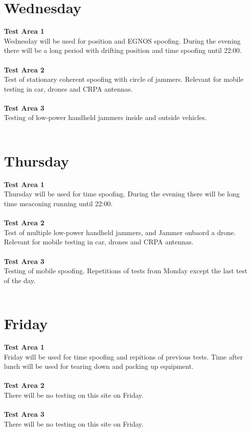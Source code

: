 \documentclass[a4paper]{book}
\begin{document}
\begin{landscape}
\chapter{Wednesday}
\Large \textbf{Test Area 1} \\
Wednesday will be used for position and EGNOS spoofing. During the evening there will be a long period with drifting position and time spoofing until 22:00. \\ \\
\Large \textbf{Test Area 2} \\
Test of stationary coherent spoofing with circle of jammers. Relevant for mobile testing in car, drones and CRPA antennas.\\ \\
\Large \textbf{Test Area 3} \\
Testing of low-power handheld jammers inside and outside vehicles.\\ \\

%

\chapter{Thursday}
\Large \textbf{Test Area 1} \\
Thursday will be used for time spoofing. During the evening there will be long time meaconing running until 22:00.\\ \\
\Large \textbf{Test Area 2} \\
Test of multiple low-power handheld jammers, and Jammer onbaord a drone. Relevant for mobile testing in car, drones and CRPA antennas.\\ \\
\Large \textbf{Test Area 3} \\
Testing of mobile spoofing. Repetitions of tests from Monday except the last test of the day.\\ \\

%

\chapter{Friday}
\Large \textbf{Test Area 1} \\
Friday will be used for time spoofing and repitions of previous tests. Time after lunch will be used for tearing down and packing up equipment.\\ \\
\Large \textbf{Test Area 2} \\
There will be no testing on this site on Friday.\\ \\
\Large \textbf{Test Area 3} \\
There will be no testing on this site on Friday.\\ \\

%

\end{landscape}
\end{document}

